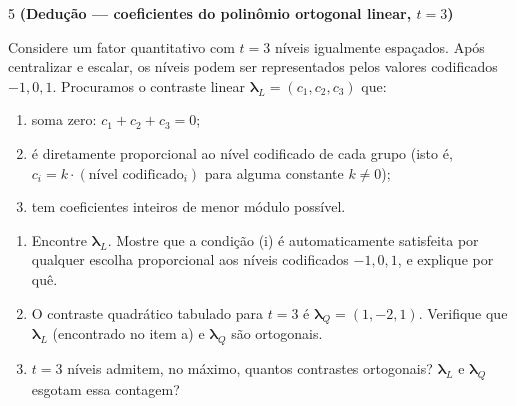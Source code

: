 \documentclass[11pt]{article}
\begin{document}
\begin{questao}{5} \textbf{(Dedução --- coeficientes do polinômio ortogonal linear, $t=3$)}

Considere um fator quantitativo com $t=3$ níveis igualmente espaçados. Após centralizar e
escalar, os níveis podem ser representados pelos valores codificados $-1, 0, 1$. Procuramos o
contraste linear $\boldsymbol\lambda_L = (c_1, c_2, c_3)$ que:
\begin{enumerate}[label=(\roman*)]
  \item soma zero: $c_1 + c_2 + c_3 = 0$;
  \item é diretamente proporcional ao nível codificado de cada grupo (isto é, $c_i = k \cdot
    (\text{nível codificado}_i)$ para alguma constante $k \neq 0$);
  \item tem coeficientes inteiros de menor módulo possível.
\end{enumerate}

\begin{enumerate}[label=(\alph*)]
  \item Encontre $\boldsymbol\lambda_L$. Mostre que a condição (i) é automaticamente satisfeita
    por qualquer escolha proporcional aos níveis codificados $-1, 0, 1$, e explique por quê.
  \item O contraste quadrático tabulado para $t=3$ é $\boldsymbol\lambda_Q = (1,-2,1)$. Verifique
    que $\boldsymbol\lambda_L$ (encontrado no item a) e $\boldsymbol\lambda_Q$ são ortogonais.
  \item $t=3$ níveis admitem, no máximo, quantos contrastes ortogonais? $\boldsymbol\lambda_L$ e
    $\boldsymbol\lambda_Q$ esgotam essa contagem?
\end{enumerate}
\end{questao}
\end{document}
